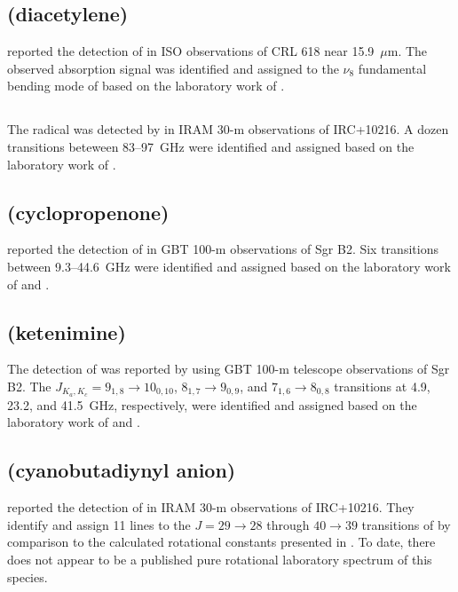 \documentclass[twocolumn]{aastex631}
\begin{document}
	\subsection{ (diacetylene)}
	\label{HC4H}
	
	\citet{Cernicharo:2001mw} reported the detection of  in ISO observations of CRL 618 near 15.9~$\mu$m.  The observed absorption signal was identified and assigned to the $\nu_8$ fundamental bending mode of  based on the laboratory work of \citet{Arie:1992gh}.
	
	\subsection{}
	\label{HC4N}
	
	The  radical was detected by \citet{Cernicharo:2004eh} in IRAM 30-m observations of IRC+10216.  A dozen transitions beteween 83--97~GHz were identified and assigned based on the laboratory work of \citet{Tang:1999yt}.
	
	\subsection{ (cyclopropenone)}
	\label{c-H2C3O}
	
	\citet{Hollis:2006ih} reported the detection of  in GBT 100-m observations of Sgr B2.  Six transitions between 9.3--44.6~GHz were identified and assigned based on the laboratory work of \citet{Benson:1973bs} and \citet{Guillemin:1990hp}.
	
	\subsection{ (ketenimine)}
	\label{CH2CNH}
	
	The detection of  was reported by \citet{Lovas:2006pj} using GBT 100-m telescope observations of Sgr B2.  The $J_{K_a,K_c} = 9_{1,8}\rightarrow10_{0,10}$, $8_{1,7}\rightarrow9_{0,9}$, and $7_{1,6}\rightarrow8_{0,8}$ transitions at 4.9, 23.2, and 41.5~GHz, respectively, were identified and assigned based on the laboratory work of \citet{Rodler:1984jm} and \citet{Rodler:1986hb}.
	
	\subsection{ (cyanobutadiynyl anion)}
	\label{C5N-}
	
    \citet{Cernicharo:2008wi} reported the detection of  in IRAM 30-m observations of IRC+10216.  They identify and assign 11 lines to the $J = 29\rightarrow28$ through $40\rightarrow39$ transitions of  by comparison to the calculated rotational constants presented in \citet{Botschwina:2008bw}.  To date, there does not appear to be a published pure rotational laboratory spectrum of this species.
    
\end{document}
